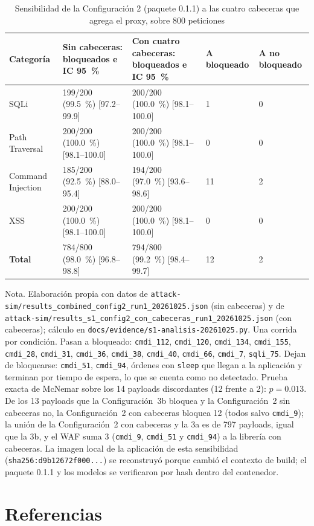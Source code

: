 \begin{table}[H]
\centering
\small
\begin{tabular}{|L{2.7cm}|L{3.7cm}|L{3.7cm}|L{1.6cm}|L{1.6cm}|}
\hline
\textbf{Categoría} & \textbf{Sin cabeceras: bloqueados e IC 95~\%} & \textbf{Con cuatro cabeceras: bloqueados e IC 95~\%} & \textbf{A bloqueado} & \textbf{A no bloqueado} \\ \hline
SQLi & 199/200 (99.5~\%) [97.2--99.9] & 200/200 (100.0~\%) [98.1--100.0] & 1 & 0 \\ \hline
Path Traversal & 200/200 (100.0~\%) [98.1--100.0] & 200/200 (100.0~\%) [98.1--100.0] & 0 & 0 \\ \hline
Command Injection & 185/200 (92.5~\%) [88.0--95.4] & 194/200 (97.0~\%) [93.6--98.6] & 11 & 2 \\ \hline
XSS & 200/200 (100.0~\%) [98.1--100.0] & 200/200 (100.0~\%) [98.1--100.0] & 0 & 0 \\ \hline
\textbf{Total} & 784/800 (98.0~\%) [96.8--98.8] & 794/800 (99.2~\%) [98.4--99.7] & 12 & 2 \\ \hline
\end{tabular}
\caption[Sensibilidad de la Configuración 2 a las cabeceras del proxy]{Sensibilidad de la Configuración 2 (paquete 0.1.1) a las cuatro cabeceras que agrega el proxy, sobre 800 peticiones}
\label{tab:anx-sensibilidad}
\end{table}
{\footnotesize Nota. Elaboración propia con datos de
\texttt{attack-sim/results\_combined\_config2\_run1\_20261025.json} (sin cabeceras) y de
\texttt{attack-sim/results\_s1\_config2\_con\_cabeceras\_run1\_20261025.json} (con cabeceras); cálculo
en \texttt{docs/evidence/s1-analisis-20261025.py}. Una corrida por condición. Pasan a bloqueado: \texttt{cmdi\_112}, \texttt{cmdi\_120}, \texttt{cmdi\_134}, \texttt{cmdi\_155}, \texttt{cmdi\_28}, \texttt{cmdi\_31}, \texttt{cmdi\_36}, \texttt{cmdi\_38}, \texttt{cmdi\_40}, \texttt{cmdi\_66}, \texttt{cmdi\_7}, \texttt{sqli\_75}. Dejan de bloquearse: \texttt{cmdi\_51}, \texttt{cmdi\_94}, órdenes con \texttt{sleep} que llegan a la aplicación y terminan por tiempo de
espera, lo que se cuenta como no detectado. Prueba exacta de McNemar sobre los 14 payloads
discordantes (12 frente a 2): $p = 0.013$. De los 13 payloads que la Configuración~3b bloquea y la
Configuración~2 sin cabeceras no, la Configuración~2 con cabeceras bloquea 12 (todos salvo
\texttt{cmdi\_9}); la unión de la Configuración~2 con cabeceras y la 3a es de 797 payloads, igual que
la 3b, y el WAF suma 3 (\texttt{cmdi\_9}, \texttt{cmdi\_51} y \texttt{cmdi\_94}) a la librería con
cabeceras. La imagen local de la aplicación de esta sensibilidad (\texttt{sha256:d9b12672f000...}) se
reconstruyó porque cambió el contexto de build; el paquete 0.1.1 y los modelos se verificaron por
hash dentro del contenedor.}

\ifdefined\modoensamble
\else
	\section*{Referencias}
	\printbibliography[heading=none]
	
\fi
